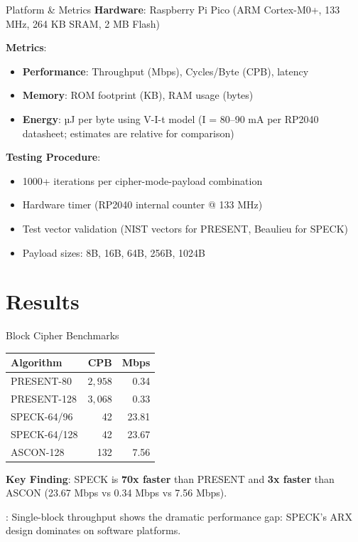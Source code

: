 \documentclass[aspectratio=169]{beamer}
\begin{document}
\begin{frame}{Platform \& Metrics}
\textbf{Hardware}: Raspberry Pi Pico (ARM Cortex-M0+, 133 MHz, 264 KB SRAM, 2 MB Flash)

\vspace{0.15cm}
\textbf{Metrics}:
\begin{itemize}
    \item \textbf{Performance}: Throughput (Mbps), Cycles/Byte (CPB), latency
    \item \textbf{Memory}: ROM footprint (KB), RAM usage (bytes)
    \item \textbf{Energy}: µJ per byte using V-I-t model (I = 80--90 mA per RP2040 datasheet; estimates are relative for comparison)
\end{itemize}

\vspace{0.15cm}
\textbf{Testing Procedure}:
\begin{itemize}
    \item 1000+ iterations per cipher-mode-payload combination
    \item Hardware timer (RP2040 internal counter @ 133 MHz)
    \item Test vector validation (NIST vectors for PRESENT, Beaulieu for SPECK)
    \item Payload sizes: 8B, 16B, 64B, 256B, 1024B
\end{itemize}
\end{frame}


\section{Results}

\begin{frame}{Block Cipher Benchmarks}
\vspace{-0.3cm}
\begin{table}
    \centering
    \begin{tabular}{lrr}
        \toprule
        \textbf{Algorithm} & \textbf{CPB} & \textbf{Mbps} \\
        \midrule
        PRESENT-80 & $2{,}958$ & 0.34 \\
        PRESENT-128 & $3{,}068$ & 0.33 \\
        SPECK-64/96 & 42 & 23.81 \\
        SPECK-64/128 & 42 & 23.67 \\
        ASCON-128 & 132 & 7.56 \\
        \bottomrule
    \end{tabular}
\end{table}
\vspace{0.05cm}
\textbf{\large Key Finding}: \alert{SPECK is \textbf{70x faster}} than PRESENT and \textbf{3x faster} than ASCON (\alert{23.67 Mbps} vs 0.34 Mbps vs 7.56 Mbps).

\vspace{0.15cm}
\small \textit{}: Single-block throughput shows the dramatic performance gap: SPECK's ARX design dominates on software platforms.
\end{frame}
\end{document}
